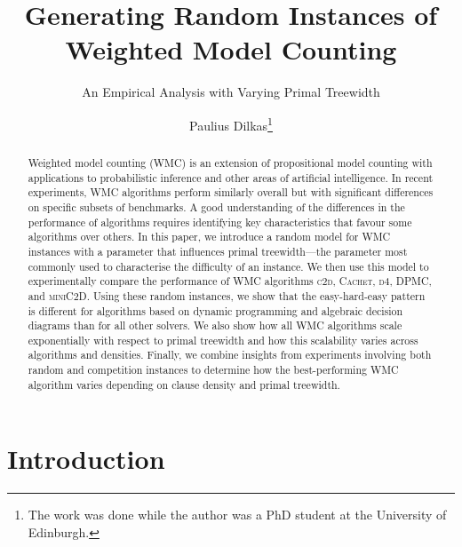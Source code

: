 \documentclass[runningheads]{llncs}
\begin{document}
\title{Generating Random Instances of\\Weighted Model Counting}
\subtitle{An Empirical Analysis with Varying Primal Treewidth}

\author{Paulius Dilkas\thanks{The work was done while the author was a PhD
    student at the University of Edinburgh.}}


\maketitle

\begin{abstract}
  Weighted model counting (\textsf{WMC}) is an extension of propositional model
  counting with applications to probabilistic inference and other areas of
  artificial intelligence. In recent experiments, \textsf{WMC} algorithms
  perform similarly overall but with significant differences on specific subsets
  of benchmarks. A good understanding of the differences in the performance of
  algorithms requires identifying key characteristics that favour some
  algorithms over others. In this paper, we introduce a random model for
  \textsf{WMC} instances with a parameter that influences primal treewidth---the
  parameter most commonly used to characterise the difficulty of an instance. We
  then use this model to experimentally compare the performance of \textsf{WMC}
  algorithms \textsc{c2d}, \textsc{Cachet}, \textsc{d4}, \textsc{DPMC}, and
  \textsc{miniC2D}. Using these random instances, we show that the
  easy-hard-easy pattern is different for algorithms based on dynamic
  programming and algebraic decision diagrams than for all other solvers. We
  also show how all \textsf{WMC} algorithms scale exponentially with respect to
  primal treewidth and how this scalability varies across algorithms and
  densities. Finally, we combine insights from experiments involving both random
  and competition instances to determine how the best-performing \textsf{WMC}
  algorithm varies depending on clause density and primal treewidth.

\end{abstract}

\section{Introduction}
\end{document}
